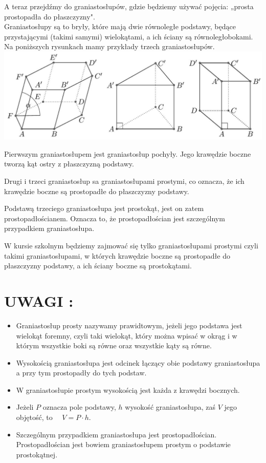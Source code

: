 \documentclass[10pt]{article}
\begin{document}
A teraz przejdźmy do graniastosłupów, gdzie będziemy używać pojęcia: „prosta prostopadła do płaszczyzny".\\
Graniastosłupy są to bryły, które mają dwie równoległe podstawy, będące przystającymi (takimi samymi) wielokątami, a ich ściany są równoległobokami. Na poniższych rysunkach mamy przykłady trzech graniastosłupów.\\
\includegraphics[max width=\textwidth, center]{2024_11_21_e9b4faa005d5be2cc318g-076(1)}

Pierwszym graniastosłupem jest graniastosłup pochyły. Jego krawędzie boczne tworzą kąt ostry z płaszczyzną podstawy.

Drugi i trzeci graniastosłup sa graniastosłupami prostymi, co oznacza, że ich krawędzie boczne są prostopadłe do płaszczyzny podstawy.

Podstawą trzeciego graniastosłupa jest prostokąt, jest on zatem prostopadłościanem. Oznacza to, że prostopadłościan jest szczególnym przypadkiem graniastosłupa.

W kursie szkolnym będziemy zajmować się tylko graniastosłupami prostymi czyli takimi graniastosłupami, w których krawędzie boczne są prostopadłe do płaszczyzny podstawy, a ich ściany boczne są prostokątami.

\section*{UWAGI :}
\begin{itemize}
  \item Graniastosłup prosty nazywamy prawidtowym, jeżeli jego podstawa jest wielokąt foremny, czyli taki wielokąt, który można wpisać w okrąg i w którym wszystkie boki są równe oraz wszystkie kąty są równe.
  \item Wysokością graniastosłupa jest odcinek łączący obie podstawy graniastosłupa a przy tym prostopadły do tych podstaw.
  \item W graniastosłupie prostym wysokością jest każda z krawędzi bocznych.
  \item Jeżeli \(P\) oznacza pole podstawy, \(h\) wysokość graniastosłupa, zaś \(V\) jego objętość, to \(\quad V=P \cdot h\).
  \item Szczególnym przypadkiem graniastosłupa jest prostopadłościan. Prostopadłościan jest bowiem graniastosłupem prostym o podstawie prostokątnej.
\end{itemize}
\end{document}
